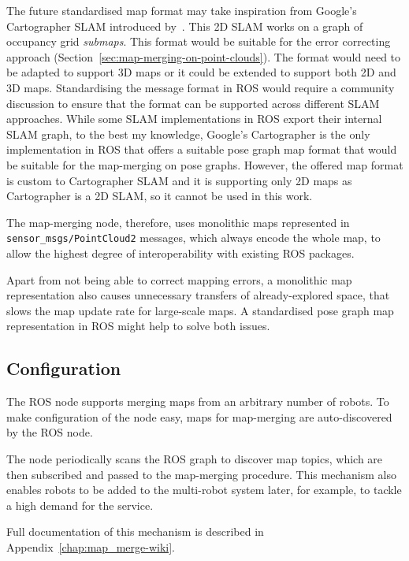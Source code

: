 The future standardised map format may take inspiration from Google's Cartographer \gls{SLAM} introduced by~\citet{hess2016cartographer}. This \gls{2D} \gls{SLAM} works on a graph of occupancy grid \textit{submaps}. This format would be suitable for the error correcting approach (Section~\ref{sec:map-merging-on-point-clouds}). The format would need to be adapted to support \gls{3D} maps or it could be extended to support both \gls{2D} and \gls{3D} maps. Standardising the message format in \gls{ROS} would require a community discussion to ensure that the format can be supported across different \gls{SLAM} approaches. While some \gls{SLAM} implementations in \gls{ROS} export their internal \gls{SLAM} graph, to the best my knowledge, Google's Cartographer is the only implementation in \gls{ROS} that offers a suitable pose graph map format that would be suitable for the map-merging on pose graphs. However, the offered map format is custom to Cartographer \gls{SLAM} and it is supporting only \gls{2D} maps as Cartographer is a \gls{2D} \gls{SLAM}, so it cannot be used in this work.

The map-merging node, therefore, uses monolithic maps represented in \texttt{sen\-sor\_msgs/\-Point\-Cloud2} messages, which always encode the whole map, to allow the highest degree of interoperability with existing \gls{ROS} packages.

Apart from not being able to correct mapping errors, a monolithic map representation also causes unnecessary transfers of already-explored space, that slows the map update rate for large-scale maps. A standardised pose graph map representation in \gls{ROS} might help to solve both issues.

\subsection{Configuration}
\label{sec:configuration}

The \gls{ROS} node supports merging maps from an arbitrary number of robots. To make configuration of the node easy, maps for map-merging are auto-discovered by the \gls{ROS} node.

The node periodically scans the \gls{ROS} graph to discover map topics, which are then subscribed and passed to the map-merging procedure. This mechanism also enables robots to be added to the multi-robot system later, for example, to tackle a high demand for the service.

Full documentation of this mechanism is described in Appendix~\ref{chap:map_merge-wiki}.

